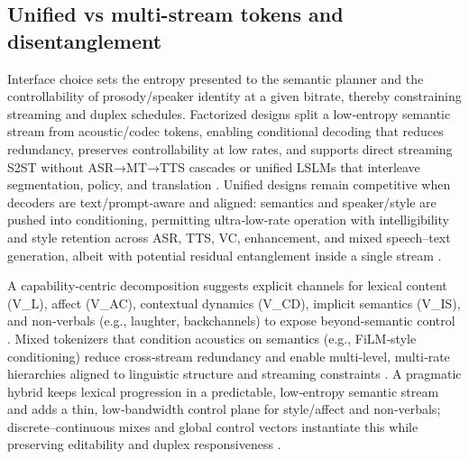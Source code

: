 \subsection{Unified vs multi-stream tokens and disentanglement} \label{subsec:Unified vs multi-stream tokens and disentanglement}

Interface choice sets the entropy presented to the semantic planner and the controllability of prosody/speaker identity at a given bitrate, thereby constraining streaming and duplex schedules. Factorized designs split a low‑entropy semantic stream from acoustic/codec tokens, enabling conditional decoding that reduces redundancy, preserves controllability at low rates, and supports direct streaming S2ST without ASR→MT→TTS cascades or unified LSLMs that interleave segmentation, policy, and translation \cite{guo2025streamuniachievingstreamingspeechtransla,zhao2024textlessstreamingspeechtranslationsemant,yang2025diffsoundstreamefficientspeechtokenizati}. Unified designs remain competitive when decoders are text/prompt‑aware and aligned: semantics and speaker/style are pushed into conditioning, permitting ultra‑low‑rate operation with intelligibility and style retention across ASR, TTS, VC, enhancement, and mixed speech–text generation, albeit with potential residual entanglement inside a single stream \cite{wang2025tadicodectextawarediffusionspeechtokeniz,wu2024speechcomposerunifyingmultiplespeechtask}.

A capability‑centric decomposition suggests explicit channels for lexical content (V_L), affect (V_AC), contextual dynamics (V_CD), implicit semantics (V_IS), and non‑verbals (e.g., laughter, backchannels) to expose beyond‑semantic control \cite{wang2025bossbeyondsemanticspeech}. Mixed tokenizers that condition acoustics on semantics (e.g., FiLM‑style conditioning) reduce cross‑stream redundancy and enable multi‑level, multi‑rate hierarchies aligned to linguistic structure and streaming constraints \cite{yang2025diffsoundstreamefficientspeechtokenizati}. A pragmatic hybrid keeps lexical progression in a predictable, low‑entropy semantic stream and adds a thin, low‑bandwidth control plane for style/affect and non‑verbals; discrete–continuous mixes and global control vectors instantiate this while preserving editability and duplex responsiveness \cite{yang2025diffsoundstreamefficientspeechtokenizati}.

